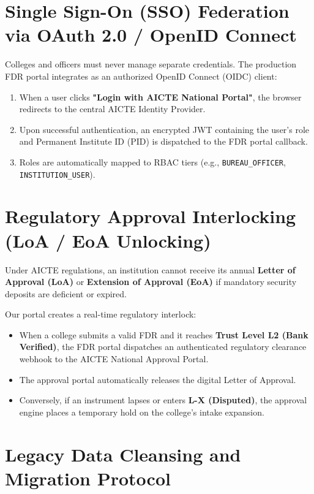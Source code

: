 \documentclass[12pt, a4paper]{report}
\begin{document}
\section{Single Sign-On (SSO) Federation via OAuth 2.0 / OpenID Connect}

Colleges and officers must never manage separate credentials. The production FDR portal integrates as an authorized OpenID Connect (OIDC) client:
\begin{enumerate}[leftmargin=2em]
  \item When a user clicks \textbf{"Login with AICTE National Portal"}, the browser redirects to the central AICTE Identity Provider.
  \item Upon successful authentication, an encrypted JWT containing the user's role and Permanent Institute ID (PID) is dispatched to the FDR portal callback.
  \item Roles are automatically mapped to RBAC tiers (e.g., \texttt{BUREAU\_OFFICER}, \texttt{INSTITUTION\_USER}).
\end{enumerate}

\section{Regulatory Approval Interlocking (LoA / EoA Unlocking)}

Under AICTE regulations, an institution cannot receive its annual \textbf{Letter of Approval (LoA)} or \textbf{Extension of Approval (EoA)} if mandatory security deposits are deficient or expired. 

Our portal creates a real-time regulatory interlock:
\begin{itemize}[leftmargin=2em]
  \item When a college submits a valid FDR and it reaches \textbf{Trust Level L2 (Bank Verified)}, the FDR portal dispatches an authenticated regulatory clearance webhook to the AICTE National Approval Portal.
  \item The approval portal automatically releases the digital Letter of Approval.
  \item Conversely, if an instrument lapses or enters \textbf{L-X (Disputed)}, the approval engine places a temporary hold on the college's intake expansion.
\end{itemize}

\section{Legacy Data Cleansing and Migration Protocol}
\end{document}
